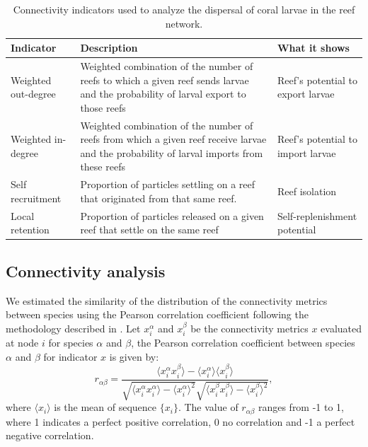 \documentclass[preprint,12pt,authoryear]{elsarticle}
\newcommand{\mean}[1]{\langle {#1} \rangle}
\begin{document}
\begin{table}
    \begin{adjustwidth}{-1in}{-1in}
    \centering
    \small
    \begin{tabular}{p{}p{}p{}}
        \hline
        \textbf{Indicator} & \textbf{Description} & \textbf{What it shows} \\
        \hline
        Weighted out-degree & Weighted combination of the number of reefs to which a given reef sends larvae and the probability of larval export to those reefs & Reef's potential to export larvae \\
        Weighted in-degree & Weighted combination of the number of reefs from which a given reef receive larvae and the probability of larval imports from these reefs & Reef's potential to import larvae \\
        Self recruitment & Proportion of particles settling on a reef that originated from that same reef. & Reef isolation \\
        Local retention & Proportion of particles released on a given reef that settle on the same reef & Self-replenishment potential \\
        \hline
    \end{tabular}
    \end{adjustwidth}
    \caption{Connectivity indicators used to analyze the dispersal of coral larvae in the reef network.}\label{tab:indicators}
\end{table}

\subsection*{Connectivity analysis}

We estimated the similarity of the distribution of the connectivity metrics between species using the Pearson correlation coefficient following the methodology described in \citep{boccaletti2014structure}. Let $x_i^\alpha$ and $x^\beta_i$ be the connectivity metrics $x$ evaluated at node $i$ for species $\alpha$ and $\beta$, the Pearson correlation coefficient between species $\alpha$ and $\beta$ for indicator $x$ is given by:
\begin{equation}
   r_{\alpha\beta} =  \dfrac{\mean{x_i^{\alpha}x_i^{\beta}} - \mean{x_i^\alpha}\mean{x_i^\beta}}{\sqrt{\mean{x_i^\alpha x_i^\alpha} - \mean{x_i^\alpha}^2}\sqrt{\mean{x_i^\beta x_i^\beta} - \mean{x_i^\beta}^2}},
\end{equation}
where $\mean{x_i}$ is the mean of sequence $\{x_i\}$. The value of $r_{\alpha\beta}$ ranges from -1 to 1, where 1 indicates a perfect positive correlation, 0 no correlation and -1 a perfect negative correlation.
\end{document}
